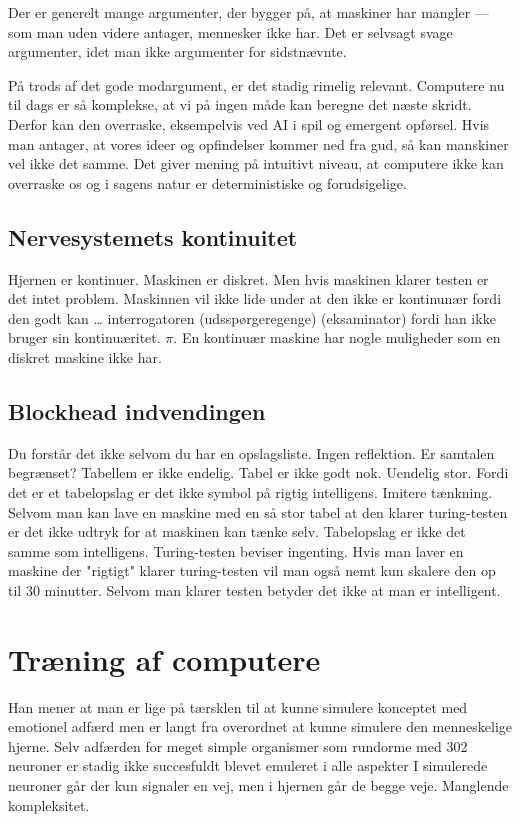\documentclass{article}
\begin{document}
Der er generelt mange argumenter, der bygger på, at maskiner har mangler --- som man uden videre antager, mennesker ikke har. Det er selvsagt svage argumenter, idet man ikke argumenter for sidstnævnte.

På trods af det gode modargument, er det stadig rimelig relevant. Computere nu til dags er så komplekse, at vi på ingen måde kan beregne det næste skridt. Derfor kan den overraske, eksempelvis ved AI i spil og emergent opførsel. Hvis man antager, at vores ideer og opfindelser kommer ned fra gud, så kan manskiner vel ikke det samme. Det giver mening på intuitivt niveau, at computere ikke kan overraske os og i sagens natur er deterministiske og forudsigelige.

\subsection{Nervesystemets kontinuitet}
Hjernen er kontinuer. Maskinen er diskret. Men hvis maskinen klarer testen er det intet problem.
Maskinnen vil ikke lide under at den ikke er kontinunær fordi den godt kan … interrogatoren (udsspørgeregenge) (eksaminator) fordi han ikke bruger sin  kontinuæritet. $\pi$. En kontinuær maskine har nogle muligheder som en diskret maskine ikke har.

\subsection{Blockhead indvendingen}
Du forstår det ikke selvom du har en opslagsliste. Ingen reflektion. 
Er samtalen begrænset? Tabellem er ikke endelig. Tabel er ikke godt nok. Uendelig stor. Fordi det er et tabelopslag er det ikke symbol på rigtig intelligens. Imitere tænkning.
Selvom man kan lave en maskine med en så stor tabel at den klarer turing-testen er det ikke udtryk for at maskinen kan tænke selv. Tabelopslag er ikke det samme som intelligens. Turing-testen beviser ingenting.
Hvis man laver en maskine der "rigtigt" klarer turing-testen vil man også nemt kun skalere den op til 30 minutter.
Selvom man klarer testen betyder det ikke at man er intelligent.


\section{Træning af computere}
Han mener at man er lige på tærsklen til at kunne simulere konceptet med emotionel adfærd men er langt fra overordnet at kunne simulere den menneskelige hjerne.
Selv adfærden for meget simple organismer som rundorme med 302 neuroner er stadig ikke succesfuldt blevet emuleret i alle aspekter
I simulerede neuroner går der kun signaler en vej, men i hjernen går de begge veje. Manglende kompleksitet.
\end{document}
